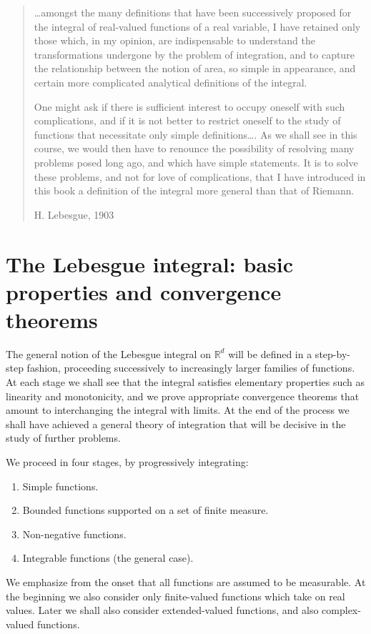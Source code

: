 \documentclass[11pt,openany]{book}
\begin{document}
\begin{quote}
\ldots amongst the many definitions that have been successively proposed for the integral of real-valued functions of a real variable, I have retained only those which, in my opinion, are indispensable to understand the transformations undergone by the problem of integration, and to capture the relationship between the notion of area, so simple in appearance, and certain more complicated analytical definitions of the integral.

One might ask if there is sufficient interest to occupy oneself with such complications, and if it is not better to restrict oneself to the study of functions that necessitate only simple definitions\ldots. As we shall see in this course, we would then have to renounce the possibility of resolving many problems posed long ago, and which have simple statements. It is to solve these problems, and not for love of complications, that I have introduced in this book a definition of the integral more general than that of Riemann.

\hfill H. Lebesgue, 1903
\end{quote}

\section{The Lebesgue integral: basic properties and convergence theorems}

The general notion of the Lebesgue integral on $\mathbb{R}^d$ will be defined in a step-by-step fashion, proceeding successively to increasingly larger families of functions. At each stage we shall see that the integral satisfies elementary properties such as linearity and monotonicity, and we prove appropriate convergence theorems that amount to interchanging the integral with limits. At the end of the process we shall have achieved a general theory of integration that will be decisive in the study of further problems.

We proceed in four stages, by progressively integrating:
\begin{enumerate}
\item Simple functions.
\item Bounded functions supported on a set of finite measure.
\item Non-negative functions.
\item Integrable functions (the general case).
\end{enumerate}
We emphasize from the onset that all functions are assumed to be measurable. At the beginning we also consider only finite-valued functions which take on real values. Later we shall also consider extended-valued functions, and also complex-valued functions.
\end{document}
